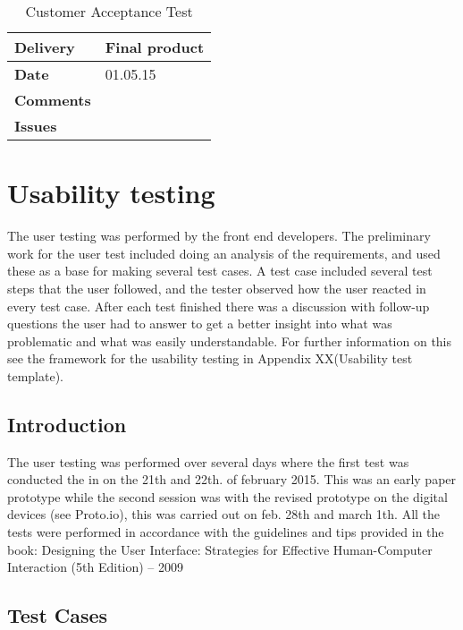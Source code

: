 {\renewcommand{\arraystretch}{2}%
\begin{center}
	\begin{longtable}{ | p{4cm} | p{13cm} | }
		
		\caption[Customer Acceptance test]{Customer Acceptance Test } \label{Tab:cattest5}\\
		\hline
		\textbf{Delivery} & Final product\\ \hline
		\textbf{Date} & 01.05.15 \\ \hline
		 \textbf{Comments} &   \\ \hline
		 \textbf{Issues} \\ \hline
	\end{longtable}
\end{center}

\section{Usability testing}

The user testing was performed by the front end developers. The preliminary work for the user test included doing an analysis of the requirements, and used these as a base for making several test cases. 
A test case included several test steps that the user followed, and the tester observed how the user reacted in every test case. After each test finished there was a discussion with follow-up questions the user had to answer to get a better insight into what was problematic and what was easily understandable. For further information on this see the framework for the usability testing in Appendix XX(Usability test template).

\subsection{Introduction}
The user testing was performed over several days where the first test was conducted the in on the 21th and 22th. of february 2015. This was an early paper prototype while the second session was with the revised prototype on the digital devices (see Proto.io), this was carried out on feb. 28th and march 1th. All the tests were performed in accordance with the guidelines and tips provided in the book: Designing the User Interface: Strategies for Effective Human-Computer Interaction (5th Edition) – 2009

\subsection{Test Cases}

}
